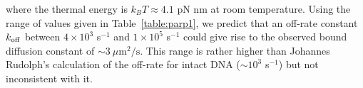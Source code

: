 where the thermal energy is $k_BT \approx 4.1$ pN nm at room temperature.  Using the range of values given in Table~\ref{table:parp1}, we predict that an off-rate constant $k_{\rm off}$ between $4\times10^3$ s$^{-1}$ and $1\times 10^5$ s$^{-1}$ could give rise to the observed bound diffusion constant of $\sim 3\ \mu\mathrm{m}^2/\mathrm{s}$. This range is rather higher than Johannes Rudolph's calculation of the off-rate for intact DNA ($\sim 10^3$ s$^{-1}$) but not inconsistent with it.



%
%

